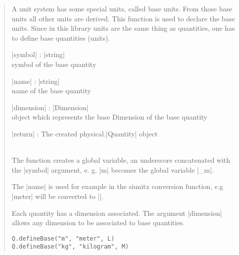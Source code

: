 \documentclass{ltxdoc}
\begin{document}
\begin{quote}
  A unit system has some special units, called base units. From those base units all other units are derived. This function is used to declare the base units. Since in this library units are the same thing as quantities, one has to define base quantities (units). 

  \subtitle{Parameters}
  \begin{description}
  \item |symbol| : |string|\\
    symbol of the base quantity

  \item |name| : |string|\\
    name of the base quantity

  \item |dimension| : |Dimension|\\
    object which represents the base Dimension of the base quantity

  \item |return| : The created physical.|Quantity| object
  \end{description}

  \subtitle{Notes}\\
  The function creates a global variable, an underscore concatenated with the |symbol| argument, e. g. |m| becomes the global variable |_m|.

  The |name| is used for example in the siunitx conversion function, e.g |meter| will be converted to |\meter|. 

  Each quantity has a dimension associated. The argument |dimension| allows any dimension to be associated to base quantities. 

  \subtitle{Examples}
  \begin{lstlisting}
Q.defineBase("m", "meter", L)
Q.defineBase("kg", "kilogram", M)
  \end{lstlisting}
\end{quote}
\end{document}
